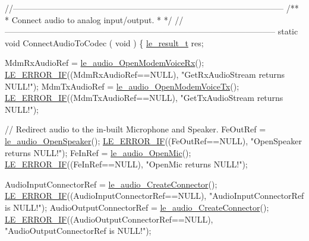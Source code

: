 \begin{DoxyCodeInclude}
{{{{\textcolor{comment}{//--------------------------------------------------------------------------------------------------}\textcolor{comment}{}
\textcolor{comment}{/**}
\textcolor{comment}{ * Connect audio to analog input/output.}
\textcolor{comment}{ *}
\textcolor{comment}{ */}
\textcolor{comment}{//--------------------------------------------------------------------------------------------------}
\textcolor{keyword}{static} \textcolor{keywordtype}{void} ConnectAudioToCodec
(
    \textcolor{keywordtype}{void}
)
\{
    \hyperlink{le__basics_8h_a1cca095ed6ebab24b57a636382a6c86c}{le\_result\_t} res;

    MdmRxAudioRef = \hyperlink{le__audio__interface_8h_ae3ed568ba4d2763ea77e17e77b20ff02}{le\_audio\_OpenModemVoiceRx}();
    \hyperlink{le__log_8h_aceaf11a11691d6c676e36dd317b38dbd}{LE\_ERROR\_IF}((MdmRxAudioRef==NULL), \textcolor{stringliteral}{"GetRxAudioStream returns NULL!"});
    MdmTxAudioRef = \hyperlink{le__audio__interface_8h_ad745f008bb04873c817da7af3daf783d}{le\_audio\_OpenModemVoiceTx}();
    \hyperlink{le__log_8h_aceaf11a11691d6c676e36dd317b38dbd}{LE\_ERROR\_IF}((MdmTxAudioRef==NULL), \textcolor{stringliteral}{"GetTxAudioStream returns NULL!"});

    \textcolor{comment}{// Redirect audio to the in-built Microphone and Speaker.}
    FeOutRef = \hyperlink{le__audio__interface_8h_a5c19afce44021c4abf6193707317f8de}{le\_audio\_OpenSpeaker}();
    \hyperlink{le__log_8h_aceaf11a11691d6c676e36dd317b38dbd}{LE\_ERROR\_IF}((FeOutRef==NULL), \textcolor{stringliteral}{"OpenSpeaker returns NULL!"});
    FeInRef = \hyperlink{le__audio__interface_8h_a74f1ef979329f6c2bd56ea622f4d05b2}{le\_audio\_OpenMic}();
    \hyperlink{le__log_8h_aceaf11a11691d6c676e36dd317b38dbd}{LE\_ERROR\_IF}((FeInRef==NULL), \textcolor{stringliteral}{"OpenMic returns NULL!"});

    AudioInputConnectorRef = \hyperlink{le__audio__interface_8h_a570aaf85086f00aca592acfbaaa237be}{le\_audio\_CreateConnector}();
    \hyperlink{le__log_8h_aceaf11a11691d6c676e36dd317b38dbd}{LE\_ERROR\_IF}((AudioInputConnectorRef==NULL), \textcolor{stringliteral}{"AudioInputConnectorRef is NULL!"});
    AudioOutputConnectorRef = \hyperlink{le__audio__interface_8h_a570aaf85086f00aca592acfbaaa237be}{le\_audio\_CreateConnector}();
    \hyperlink{le__log_8h_aceaf11a11691d6c676e36dd317b38dbd}{LE\_ERROR\_IF}((AudioOutputConnectorRef==NULL), \textcolor{stringliteral}{"AudioOutputConnectorRef is NULL!"});

}}}}
\end{DoxyCodeInclude}
